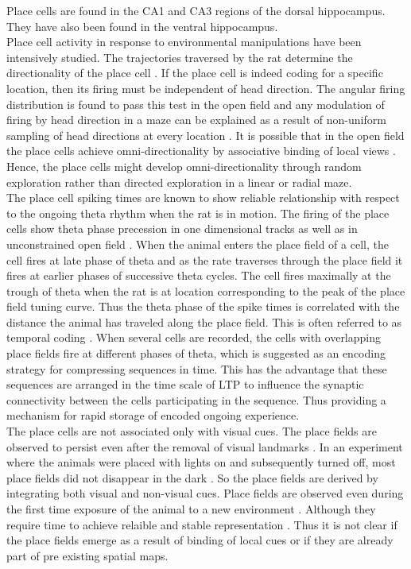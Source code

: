 Place cells are found in the CA1 and CA3 regions of the dorsal hippocampus. They have also been found in the ventral hippocampus. \\ 
Place cell activity in response to environmental manipulations have been intensively studied. The trajectories traversed by the rat determine the directionality of the place cell \cite{Save1998}. If the place cell is indeed coding for a specific location, then its firing must be independent of  head direction. The angular firing distribution is found to pass this test in the open field and any modulation of firing by head direction in a maze can be explained as a result of non-uniform sampling of head directions at every location \cite{Muller1994}. It is possible that in the open field the place cells achieve omni-directionality by associative binding of local views \cite{Sharp1991}. Hence, the place cells might develop omni-directionality through random exploration rather than directed exploration in a linear or radial maze.\\
The place cell spiking times are known to show reliable relationship with respect to the ongoing theta rhythm when the rat is in motion. The firing of the place cells show theta phase precession in one dimensional tracks \cite{O'Keefe1993} as well as in unconstrained open field \cite{Skaggs1996c}. When the animal enters the place field of a cell, the cell fires at late phase of theta and as the rate traverses through the place field it fires at earlier phases of successive theta cycles. The cell fires maximally at the trough of theta when the rat is at location corresponding to the peak of the place field tuning curve. Thus the theta phase of the spike times is correlated with the distance the animal has traveled along the place field. This is often referred to as temporal coding \cite{Huxter2003}. When several cells are recorded, the cells with overlapping place fields fire at different phases of theta, which is suggested as an encoding strategy for compressing sequences in time. This has the advantage that these sequences are arranged in the time scale of LTP to influence the synaptic connectivity between the cells participating in the sequence. Thus providing a mechanism for rapid storage of encoded ongoing experience. \\
The place cells are not associated only with visual cues. The place fields are observed to persist even after the removal of visual landmarks \cite{Kubie1987}. In an experiment where the animals were placed with lights on and subsequently turned off, most place fields did not disappear in the dark \cite{Muller2008}. So the place fields are derived by integrating both visual and non-visual cues. Place fields are observed even during the first time exposure of the animal to a new environment \cite{Reccivcd1978, Tanila1997}. Although they require time to achieve relaible and stable representation \cite{Wilson1993a}. Thus it is not clear if the place fields emerge  as a result of binding of local cues or if they are already part of pre existing spatial maps.  
 
